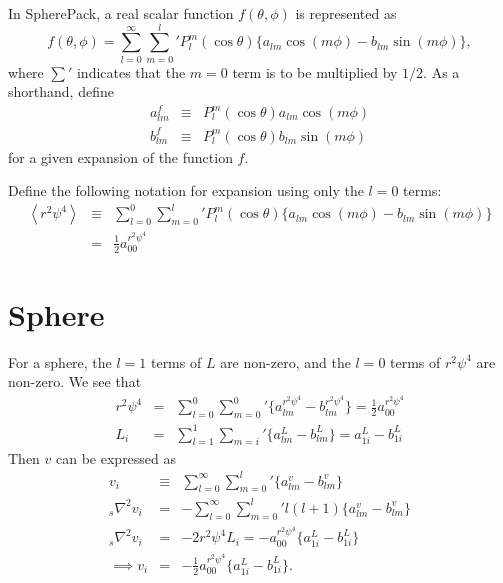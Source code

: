 \documentclass[11pt]{article}
\newcommand{\av}[1]{\left \langle #1 \right \rangle}
\begin{document}
\noindent
In SpherePack, a real scalar function $f(\theta, \phi)$ is represented as
\begin{equation}
f(\theta, \phi) = \sum_{l=0}^{\infty} {\sum_{m=0}^{l}}' P_l^m(\cos \theta)\{ a_{lm} \cos(m\phi) - b_{lm}\sin(m\phi)\},
\end{equation}
where $\sum'$ indicates that the $m=0$ term is to be multiplied by $1/2$.  As a shorthand, define
\begin{eqnarray}
a_{lm}^{f} &\equiv& P_l^m(\cos \theta) a_{lm} \cos(m \phi) \\
b_{lm}^{f} &\equiv& P_l^m(\cos \theta) b_{lm} \sin(m \phi) 
\end{eqnarray}
for a given expansion of the function $f$.

\noindent
Define the following notation for expansion using only the $l=0$ terms:
\begin{eqnarray}
\av{r^2 \psi^4} &\equiv& \sum_{l=0}^{0}{\sum_{m=0}^{l}}' P_l^m(\cos \theta)\{ a_{lm} \cos(m\phi) - b_{lm}\sin(m\phi)\} \\
&=& \frac{1}{2} a_{00}^{r^2 \psi^4}
\end{eqnarray}

\begin{comment}
\noindent
(is this a good idea?) As further shorthand, define
\begin{equation}
Y_{1j} \equiv P_1^j (\cos \theta)\{ a_{1j} \cos(j\phi) - b_{1j}\sin(j\phi)\}
\end{equation}
\end{comment}


\section{Sphere}
For a sphere, the $l=1$ terms of $L$ are non-zero, and the $l=0$ terms of $r^2 \psi^4$ are non-zero.  We see that
\begin{eqnarray}
r^2 \psi^4 &=& \sum_{l=0}^{0} {\sum_{m=0}^{0}}' \{ a_{lm}^{r^2 \psi^4}  - b_{lm}^{r^2 \psi^4} \} = \frac{1}{2} a_{00}^{r^2 \psi^4} \\
L_i &=& \sum_{l=1}^{1} {\sum_{m=i}}' \{ a_{lm}^{L}  - b_{lm}^{L} \} = a_{1i}^{L} - b_{1i}^{L}
\end{eqnarray}
Then $v$ can be expressed as
\begin{eqnarray}
v_i &\equiv& \sum_{l=0}^{\infty} {\sum_{m=0}^{l}}' \{ a_{lm}^{v}  - b_{lm}^{v} \} \\
{_s}\nabla^2 v_i &=& -\sum_{l=0}^{\infty} {\sum_{m=0}^{l}}' l(l+1)\{a_{lm}^{v}  - b_{lm}^{v} \} \\
{_s}\nabla^2 v_i &=& -2 r^2 \psi^4 L_i = - a_{00}^{r^2 \psi^4} \{ a_{1i}^{L} - b_{1i}^{L} \}\\
\implies v_i &=& -\frac{1}{2} a_{00}^{r^2 \psi^4} \{ a_{1i}^{L}-b_{1i}^{L} \}.
\end{eqnarray}
\end{document}

